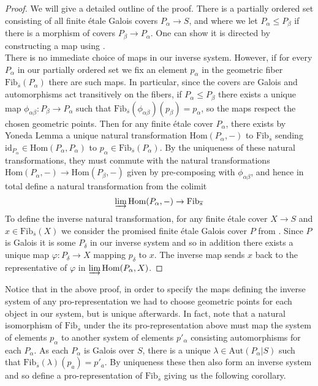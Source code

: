 \documentclass{article}
\theoremstyle{definition}
\theoremstyle{remark}
\theoremstyle{plain}
\begin{document}
\begin{proof}
	We will give a detailed outline of the proof.
	There is a partially ordered set consisting of all finite \'etale Galois covers $P_{\alpha} \to S$, and where we let $P_{\alpha} \leq P_{\beta}$ if there is a morphism of covers $P_{\beta} \to P_{\alpha}$.
	One can show it is directed by constructing a map using .\\
	\indent There is no immediate choice of maps in our inverse system.
	However, if for every $P_{\alpha}$ in our partially ordered set we fix an element $p_{\alpha}$ in the geometric fiber $\text{Fib}_{\overline{s}}(P_{\alpha})$ there are such maps.
	In particular, since the covers are Galois and automorphisms act transitively on the fibers, if $P_{\alpha} \leq P_{\beta}$ there exists a unique map $\phi_{\alpha \beta}: P_{\beta} \to P_{\alpha}$ such that $\text{Fib}_{\overline{s}}(\phi_{\alpha \beta})(p_{\beta}) = p_{\alpha}$, so the maps respect the chosen geometric points.
	Then for any finite \'etale cover $P_{\alpha}$, there exists by Yoneda Lemma a unique natural transformation $\text{Hom}(P_{\alpha}, -)$ to $\text{Fib}_{\overline{s}}$ sending $\text{id}_{P_{\alpha}} \in \text{Hom}(P_{\alpha}, P_{\alpha})$ to $p_{\alpha} \in \text{Fib}_{\overline{s}}(P_{\alpha})$.
	By the uniqueness of these natural transformations, they must commute with the natural transformations $\text{Hom}(P_{\alpha}, -) \to \text{Hom}(P_{\beta}, -)$ given by pre-composing with $\phi_{\alpha \beta}$, and hence in total define a natural transformation from the colimit
	\[\varinjlim \text{Hom}(P_{\alpha}, -) \to \text{Fib}_{\overline{s}}\]
	To define the inverse natural transformation, for any finite \'etale cover $X \to S$ and $x \in \text{Fib}_{\overline{s}}(X)$ we consider the promised finite \'etale Galois cover $P$ from .
	Since $P$ is Galois it is some $P_{\delta}$ in our inverse system and so in addition there exists a unique map $\varphi: P_{\delta} \to X$ mapping $p_{\delta}$ to $x$.
The inverse map sends $x$ back to the representative of $\varphi$ in $\varinjlim \text{Hom}(P_{\alpha}, X)$.

\end{proof}

Notice that in the above proof, in order to specify the maps defining the inverse system of any pro-representation we had to choose geometric points for each object in our system, but is unique afterwards.
In fact, note that a natural isomorphism of $\text{Fib}_{\overline{s}}$ under the its pro-representation above must map the system of elements $p_{\alpha}$ to another system of elements $p'_{\alpha}$ consisting automorphisms for each $P_{\alpha}$.
As each $P_{\alpha}$ is Galois over $S$, there is a unique $ \lambda \in \text{Aut}(P_{\alpha}|S)$ such that $\text{Fib}_{\overline{s}}(\lambda)(p_a) = p'_a$.
By uniqueness these then also form an inverse system and so define a pro-representation of $\text{Fib}_{\overline{s}}$ giving us the following corollary.
\end{document}
